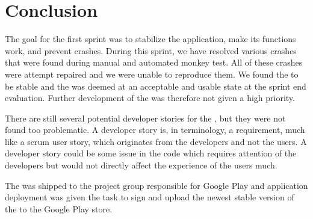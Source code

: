 
\chapter{Conclusion}
\label{cha:conclusion}

The goal for the first sprint was to stabilize the \launcher application, make its functions work, and prevent crashes. During this sprint, we have resolved various crashes that were found during manual and automated monkey test. All of these crashes were attempt repaired and we were unable to reproduce them. We found the \launcher to be stable and the \launcher was deemed at an acceptable and usable state at the sprint end evaluation. Further development of the \launcher was therefore not given a high priority. 

There are still several potential developer stories for the \launcher, but they were not found too problematic. A developer story is, in \giraf terminology, a requirement, much like a scrum user story, which originates from the developers and not the users. A developer story could be some issue in the code which requires attention of the developers but would not directly affect the experience of the users much.    

The \launcher was shipped to the project group responsible for Google Play and application deployment was given the task to sign and upload the newest stable version of the \launcher to the Google Play store. 






